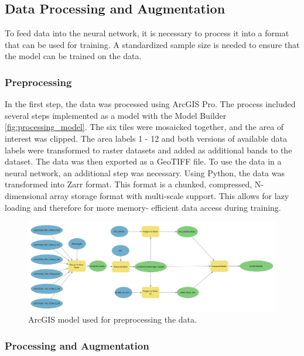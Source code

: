 \subsection{Data Processing and Augmentation}%

To feed data into the neural network, it is necessary to process it into a format that can be used for training.
A standardized sample size is needed to ensure that the model can be trained on the data.

\subsubsection{Preprocessing}%
In the first step, the data was processed using ArcGIS Pro. The process included several steps implemented as
a model with the Model Builder \autoref{fig:processing_model}. The six tiles were mosaicked together, and the area of interest 
was clipped. The area labels 1 - 12 and both versions of available data labels were transformed to raster datasets
and added as additional bands to the dataset. The data was then exported as a GeoTIFF file.
To use the data in a neural network, an additional step was necessary. Using Python,
the data was transformed into Zarr format. This format is a chunked, compressed, N-dimensional array
storage format with multi-scale support. This allows for lazy loading and therefore for more memory-
efficient data access during training.

\begin{figure}[H]
    \centering
    \captionsetup{width=0.8\linewidth}
    \includegraphics[width=\linewidth]{figures/ArcGIS_Model.png}
    \caption{ArcGIS model used for preprocessing the data.}
    \label{fig:processing_model}
\end{figure}

\subsubsection{Processing and Augmentation}%

